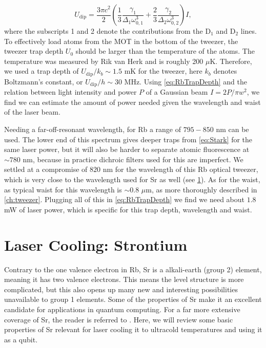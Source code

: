 \begin{equation}\label{eq:RbTrapDepth}
    U_{\text{dip}} = \frac{3\pi c^2}{2} \left(
    \frac{1}{3}\frac{\gamma_1}{\Delta_1 \omega_{0,1}^3} + \frac{2}{3}\frac{ \gamma_2}{\Delta_2 \omega_{0,2}^3} 
    \right) I,
\end{equation}
where the subscripts 1 and 2 denote the contributions from the D$_1$ and D$_2$ lines. 
To effectively load atoms from the MOT in the bottom of the tweezer, the tweezer trap depth $U_0$ should be larger than the temperature of the atoms. 
The temperature was measured by Rik van Herk \cite{Herk2022} and is roughly 200 $\mu$K.
Therefore, we used a trap depth of $U_{\text{dip}} /k_b \sim 1.5$ mK for the tweezer, here $k_b$ denotes Boltzmann's constant, or $U_{\text{dip}} / h \sim 30$ MHz.
Using \cref{eq:RbTrapDepth} and the relation between light intensity and power $P$ of a Gaussian beam $I = 2P/\pi w^2$, we find we can estimate the amount of power needed given the wavelength and waist of the laser beam. 

Needing a far-off-resonant wavelength, for Rb a range of $795 - 850$ nm can be used.
The lower end of this spectrum gives deeper traps from \cref{eq:Stark} for the same laser power, but it will also be harder to separate atomic fluorescence at $\sim 780$ nm, because in practice dichroic filters used for this are imperfect.
We settled at a compromise of $820$ nm for the wavelength of this Rb optical tweezer, which is very close to the wavelength used for Sr as well (see \cref{sec:Sr}). As for the waist, as typical waist for this wavelength is $\sim 0.8$ $\mu$m, as more thoroughly described in \cref{ch:tweezer}. Plugging all of this in \cref{eq:RbTrapDepth} we find we need about $1.8$ mW of laser power, which is specific for this trap depth, wavelength and waist.


\section{Laser Cooling: Strontium}\label{sec:Sr}

Contrary to the one valence electron in \ac{Rb}, \ac{Sr} is a alkali-earth (group 2) element, meaning it has two valence electrons.
This means the level structure is more complicated, but this also opens up many new and interesting possibilities unavailable to group 1 elements.
Some of the properties of Sr make it an excellent candidate for applications in quantum computing.
For a far more extensive coverage of Sr, the reader is referred to \cite{Stellmer2013}. 
Here, we will review some basic properties of Sr relevant for laser cooling it to ultracold temperatures and using it as a qubit.

